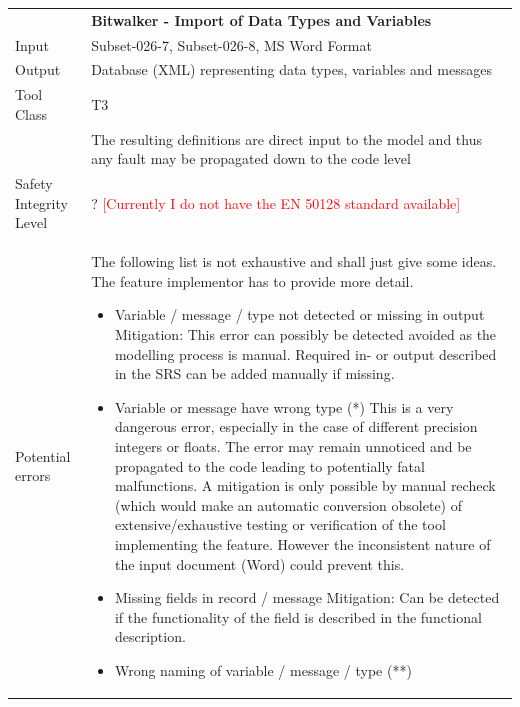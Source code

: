 \begin{longtable}{lp{}}
&\textbf{Bitwalker - Import of Data Types and Variables}\\
Input&Subset-026-7, Subset-026-8, MS Word Format\\
Output&Database (XML) representing data types, variables and messages\\
Tool Class&T3\\
          &The resulting definitions are direct input to the model and thus any fault may be propagated down to the code level\\
Safety Integrity Level&? \textcolor{red}{[Currently I do not have the EN 50128 standard available]}\\
Potential errors&The following list is not exhaustive and shall just give some ideas. The feature implementor has to provide more detail.
                                \begin{itemize}
                                  \item Variable / message / type not detected or missing in output\newline
                                       Mitigation: This error can possibly be detected avoided as the modelling process is manual. Required in- or output described in the
                                                   SRS can be added manually if missing.
                                  \item Variable or message have wrong type (*)\newline
                                       This is a very dangerous error, especially in the case of different precision integers or floats. The error may
                                       remain unnoticed and be propagated to the code leading to potentially fatal malfunctions. A mitigation is only possible by
                                       manual recheck (which would make an automatic conversion obsolete) of extensive/exhaustive testing or verification of the tool 
                                       implementing the feature. However the inconsistent nature of the input document (Word) could prevent this.
                                  \item Missing fields in record / message\newline
                                       Mitigation: Can be detected if the functionality of the field is described in the functional description.
                                  \item Wrong naming of variable / message / type (**)\newline

\end{itemize}
\end{longtable}
